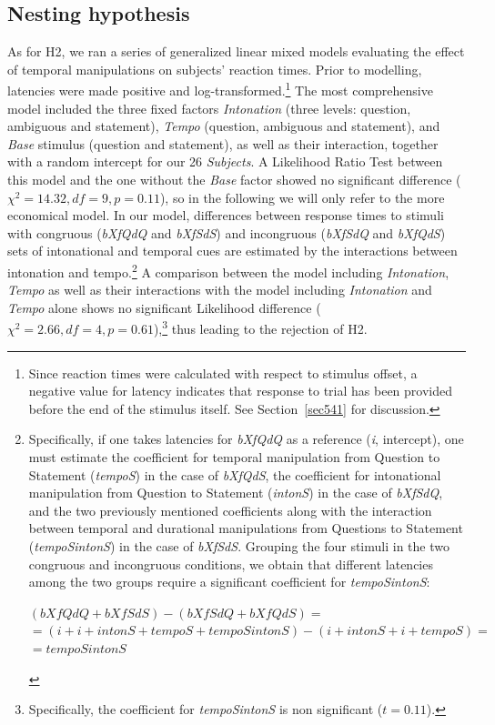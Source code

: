 \subsection{Nesting hypothesis}\label{sec532}
As for H2, we ran a series of generalized linear mixed models evaluating the effect of temporal manipulations on subjects' reaction times. Prior to modelling, latencies were made positive and log-transformed.\footnote{Since reaction times were calculated with respect to stimulus offset, a negative value for latency indicates that response to trial has been provided before the end of the stimulus itself. See Section~\ref{sec541} for discussion.} The most comprehensive model included the three fixed factors \textit{Intonation} (three levels: question, ambiguous and statement), \textit{Tempo} (question, ambiguous and statement), and \textit{Base} stimulus (question and statement), as well as their interaction, together with a random intercept for our 26 \textit{Subjects}. A Likelihood Ratio Test between this model and the one without the \textit{Base} factor showed no significant difference ($\chi^{2}=14.32, df=9, p=0.11$), so in the following we will only refer to the more economical model.
In our model, differences between response times to stimuli with congruous (\textit{bXfQdQ} and \textit{bXfSdS}) and incongruous (\textit{bXfSdQ} and \textit{bXfQdS}) sets of intonational and temporal cues are estimated by the interactions between intonation and tempo.\footnote{Specifically, if one takes latencies for \textit{bXfQdQ} as a reference (\textit{i}, intercept), one must estimate the coefficient for temporal manipulation from Question to Statement (\textit{tempoS}) in the case of \textit{bXfQdS}, the coefficient for intonational manipulation from Question to Statement (\textit{intonS}) in the case of \textit{bXfSdQ}, and the two previously mentioned coefficients along with the interaction between temporal and durational manipulations from Questions to Statement (\textit{tempoSintonS}) in the case of \textit{bXfSdS}. Grouping the four stimuli in the two congruous and incongruous conditions, we obtain that different latencies among the two groups require a significant coefficient for \textit{tempoSintonS}:
\begin{center}
$(bXfQdQ + bXfSdS) - (bXfSdQ + bXfQdS) =$\\
$= (i + i + intonS + tempoS + tempoSintonS) - (i + intonS + i + tempoS) =$\\
$= tempoSintonS$
\end{center}} A comparison between the model including \textit{Intonation}, \textit{Tempo} as well as their interactions with the model including \textit{Intonation} and \textit{Tempo} alone shows no significant Likelihood difference ($\chi^{2}=2.66, df=4, p=0.61$),\footnote{Specifically, the coefficient for \textit{tempoSintonS} is non significant ($t=0.11$).} thus leading to the rejection of H2.
